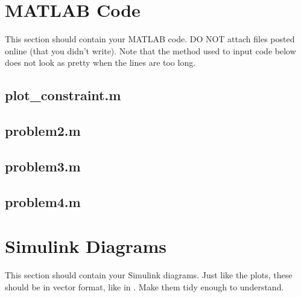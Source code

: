 \documentclass[11pt, a4paper, USenglish]{article} %
\begin{document}
\appendix

\section{MATLAB Code}\label{sec:matlab}
This section should contain your MATLAB code. DO NOT attach files posted online (that you didn't write). Note that the method used to input code below does not look as pretty when the lines are too long.

\subsection{plot\_constraint.m}\label{sec:plot_constraint_m}


\subsection{problem2.m}\label{sec:problem2_m}


\subsection{problem3.m}\label{sec:problem3_m}


\subsection{problem4.m}\label{sec:problem4_m}



\section{Simulink Diagrams}\label{sec:simulink}
This section should contain your Simulink diagrams. Just like the plots, these should be in vector format, like in . Make them tidy enough to understand.
\end{document}
